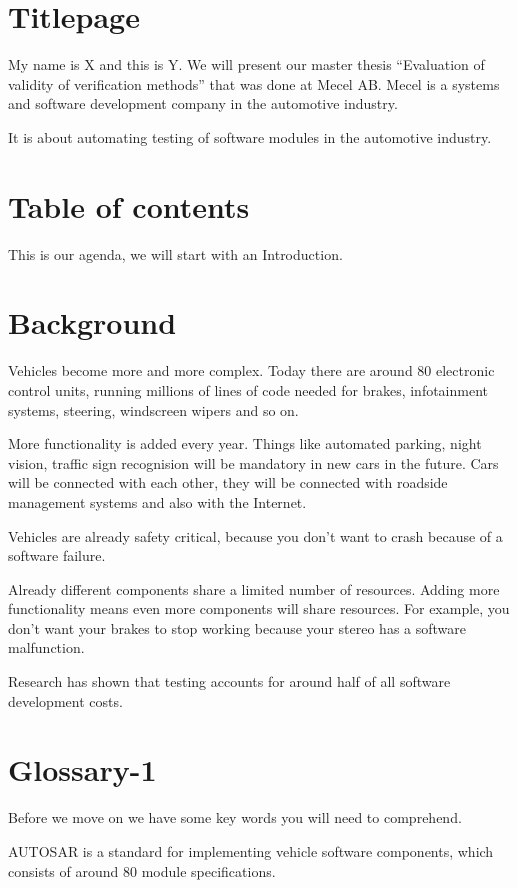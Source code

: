 \documentclass[a4paper]{article}
\begin{document}
\section{Titlepage}
My name is X and this is Y. We will present our master thesis
``Evaluation of validity of verification methods'' that was done at
Mecel AB. Mecel is a systems and software development company in the
automotive industry.

It is about automating testing of software modules in the automotive
industry.

\section{Table of contents}
This is our agenda, we will start with an Introduction.

\section{Background}
Vehicles become more and more complex. Today there are around 80
electronic control units, running millions of lines of code needed for
brakes, infotainment systems, steering, windscreen wipers and so on.

More functionality is added every year. Things like automated parking,
night vision, traffic sign recognision will be mandatory in new cars
in the future. Cars will be connected with each other, they will be
connected with roadside management systems and also with the Internet.

Vehicles are already safety critical, because you don't want to crash
because of a software failure.

Already different components share a limited number of
resources. Adding more functionality means even more components will
share resources. For example, you don't want your brakes to stop
working because your stereo has a software malfunction.

Research has shown that testing accounts for around half of all
software development costs.

\section{Glossary-1}
Before we move on we have some key words you will need to comprehend.

AUTOSAR is a standard for implementing vehicle software components,
which consists of around 80 module specifications.
\end{document}
